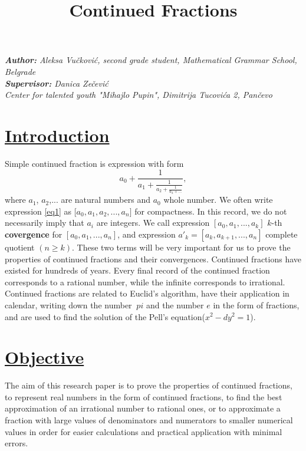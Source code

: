 \documentclass{article}
\title{\textbf{\huge Continued Fractions}}
\date{}
\author{}
\begin{document}
\setlength{\columnsep}{1.2cm}
\maketitle
\begin{center}
\vspace*{-1.5cm}
 \large\textit{\textbf{Author:} Aleksa Vu\v ckovi\'c, second grade student, Mathematical Grammar School, Belgrade}\\
    \textit{\textbf{Supervisor:} Danica Ze\v cevi\'c}\\
    \normalsize\textit{Center for talented youth "Mihajlo Pupin", Dimitrija Tucovi\'ca 2, Pan\v cevo}
\end{center}
\begin{multicols}{2}
 \noindent
\section*{\underline{Introduction}}

Simple continued fraction is expression with form
\begin{equation}
\label{eq1}
    a_0+\frac{1}{a_1+\frac{1}{a_2+\frac{1}{a_3+\dots}}},\tag{$*$}
\end{equation}
where $a_1$, $a_2$,... are natural numbers and $a_0$ whole number.
We often write expression \eqref{eq1} as [$a_0, a_1, a_2,...,a_n]$ for compactness. In this record, we do not \text necessarily imply that $ a_i $ are integers.
We call expression $[a_0,a_1,...,a_k]$  $k$-th \textbf{covergence} for $[a_0,a_1,...,a_n]$, and expression $a'_k=[a_k,a_{k+1},...,a_n]$  complete \text quotient $(n \geq k)$. These two terms will be very important for us to prove the properties of continued \text fractions and their convergences.
\text Continued fractions have \text existed for hundreds of years. Every \text final record of
the continued fraction corresponds to a \text rational number, while the infinite corresponds to \text irrational.
Continued fractions are related to Euclid's algorithm, have their application in
calendar, writing down the number $ \ pi $ and the number $ e $ in the form of fractions, and are used to find the solution of the Pell's equation($x^2-dy^2=1$).

\section*{\underline{Objective}}

The aim of this research paper is to prove the \text properties of continued fractions, to represent real numbers in the form of continued fractions, to find the best \text approximation of an irrational number to rational ones, or to approximate a fraction with large values of \text denominators and numerators to smaller \text numerical \text values in order for easier calculations and practical \text application with minimal errors.


\end{multicols}
\end{document}
